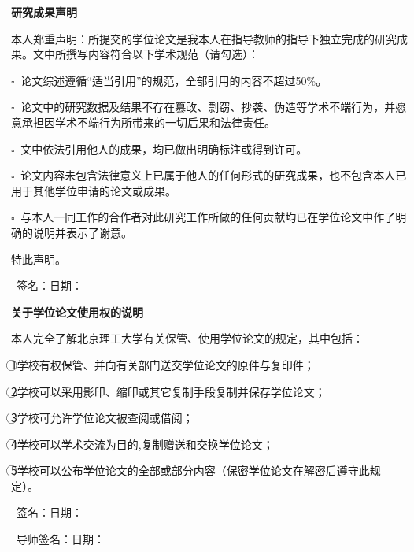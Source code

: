 
\begin{center}
\textbf{\heiti 研究成果声明}
\end{center}
\par {}\songti 本人郑重声明：所提交的学位论文是我本人在指导教师的指导下独立完成的研究成果。文中所撰写内容符合以下学术规范（请勾选）： \par $\square\ $ 论文综述遵循“适当引用”的规范，全部引用的内容不超过50\%。
\par $\square\ $ 论文中的研究数据及结果不存在篡改、剽窃、抄袭、伪造等学术不端行为，并愿意承担因学术不端行为所带来的一切后果和法律责任。
\par $\square\ $ 文中依法引用他人的成果，均已做出明确标注或得到许可。
\par $\square\ $ 论文内容未包含法律意义上已属于他人的任何形式的研究成果，也不包含本人已用于其他学位申请的论文或成果。
\par $\square\ $ 与本人一同工作的合作者对此研究工作所做的任何贡献均已在学位论文中作了明确的说明并表示了谢意。
\par 特此声明。
\par\vspace{5em}\ \hfill 签\qquad 名：\qquad\qquad 日\qquad 期：\qquad\qquad\qquad\qquad

\newpage
\begin{center}
\textbf{\heiti 关于学位论文使用权的说明}
\end{center}
\par {}\songti 本人完全了解北京理工大学有关保管、使用学位论文的规定，其中包括：
\par \textcircled{\small 1}学校有权保管、并向有关部门送交学位论文的原件与复印件；
\par \textcircled{\small 2}学校可以采用影印、缩印或其它复制手段复制并保存学位论文；
\par \textcircled{\small 3}学校可允许学位论文被查阅或借阅；
\par \textcircled{\small 4}学校可以学术交流为目的,复制赠送和交换学位论文；
\par \textcircled{\small 5}学校可以公布学位论文的全部或部分内容（保密学位论文在解密后遵守此规定）。
\par\vspace{5em}\ \hfill 签\qquad 名：\qquad\qquad 日\qquad 期：\qquad\qquad\qquad\qquad
\par\vspace{2em}\ \hfill 导师签名：\qquad\qquad 日\qquad 期：\qquad\qquad\qquad\qquad